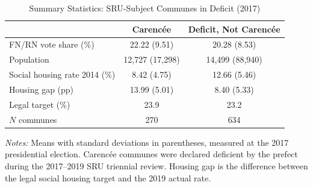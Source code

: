 \begin{table}[t]
\centering
\caption{Summary Statistics: SRU-Subject Communes in Deficit (2017)}
\label{tab:summary}
\small
\begin{tabular}{lcc}
\toprule
 & Carenc\'{e}e & Deficit, Not Carenc\'{e}e \\
\midrule
FN/RN vote share (\%) & 22.22 (9.51) & 20.28 (8.53) \\
Population & 12,727 (17,298) & 14,499 (88,940) \\
Social housing rate 2014 (\%) & 8.42 (4.75) & 12.66 (5.46) \\
Housing gap (pp) & 13.99 (5.01) & 8.40 (5.33) \\
Legal target (\%) & 23.9 & 23.2 \\
$N$ communes & 270 & 634 \\
\bottomrule
\end{tabular}
\begin{tablenotes}
\item \textit{Notes:} Means with standard deviations in parentheses, measured at the 2017 presidential election. Carenc\'{e}e communes were declared deficient by the prefect during the 2017--2019 SRU triennial review. Housing gap is the difference between the legal social housing target and the 2019 actual rate.
\end{tablenotes}
\end{table}
